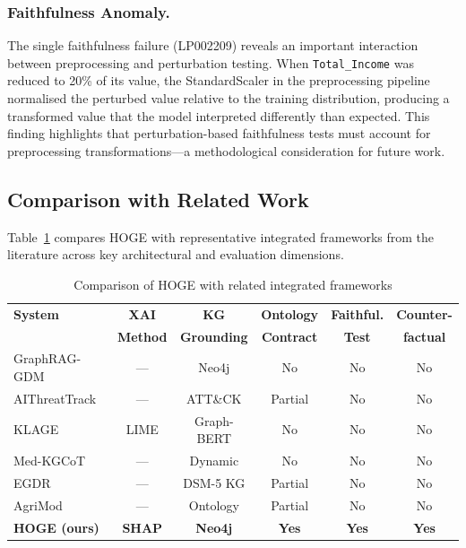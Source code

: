 \documentclass[lnbip]{svmultln}
\begin{document}
\subsubsection{Faithfulness Anomaly.}
The single faithfulness failure (LP002209) reveals an important interaction between preprocessing and perturbation testing. When \texttt{Total\_Income} was reduced to 20\% of its value, the StandardScaler in the preprocessing pipeline normalised the perturbed value relative to the training distribution, producing a transformed value that the model interpreted differently than expected. This finding highlights that perturbation-based faithfulness tests must account for preprocessing transformations---a methodological consideration for future work.

\subsection{Comparison with Related Work}

Table~\ref{tab:comparison} compares HOGE with representative integrated frameworks from the literature across key architectural and evaluation dimensions.

\begin{table}[htp]
    \centering
    \caption{Comparison of HOGE with related integrated frameworks}
    \label{tab:comparison}
    \begin{tabular}{l c c c c c}
        \toprule
        \textbf{System} & \textbf{XAI} & \textbf{KG} & \textbf{Ontology} & \textbf{Faithful.} & \textbf{Counter-} \\
        & \textbf{Method} & \textbf{Grounding} & \textbf{Contract} & \textbf{Test} & \textbf{factual} \\
        \midrule
        GraphRAG-GDM~\cite{gdm2026} & --- & Neo4j & No & No & No \\
        AIThreatTrack~\cite{threat2025} & --- & ATT\&CK & Partial & No & No \\
        KLAGE~\cite{klage2026} & LIME & Graph-BERT & No & No & No \\
        Med-KGCoT~\cite{medkgcot2025} & --- & Dynamic & No & No & No \\
        EGDR~\cite{depress2025} & --- & DSM-5 KG & Partial & No & No \\
        AgriMod~\cite{soil2025} & --- & Ontology & Partial & No & No \\
        \textbf{HOGE (ours)} & \textbf{SHAP} & \textbf{Neo4j} & \textbf{Yes} & \textbf{Yes} & \textbf{Yes} \\
        \bottomrule
    \end{tabular}
\end{table}
\end{document}
